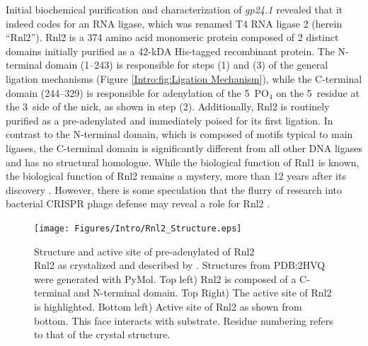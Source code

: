     Initial biochemical purification and characterization of \textit{gp24.1} \citep{Ho2002b} revealed that it indeed codes for an RNA ligase, which was renamed T4 RNA ligase 2 (herein ``Rnl2''). Rnl2 is a 374 amino acid monomeric protein composed of 2 distinct domains initially purified as a 42-kDA His-tagged recombinant protein. The N-terminal domain (1--243) is responsible for steps (1) and (3) of the general ligation mechanisms (Figure \ref{Intro:fig:Ligation Mechanism}), while the C-terminal domain (244--329) is responsible for adenylation of the 5\textprime~PO$_{4}$ on the 5\textprime~residue at the 3\textprime~side of the nick, as shown in step (2). Additionally, Rnl2 is routinely purified as a pre-adenylated and immediately poised for its first ligation. In contrast to the N-terminal domain, which is composed of motifs typical to main ligases, the C-terminal domain is significantly  different from all other DNA ligases and has no structural homologue. While the biological function of Rnl1 is known, the biological function of Rnl2 remains a mystery, more than 12 years after its discovery \citep{Chauleau2013b}. However, there is some speculation that the flurry of research into bacterial CRISPR phage defense may reveal a role for Rnl2 \citep{Barrangou2007c,Chauleau2013b}.

    \begin{figure} %
      \centering 
      \texttt{[image: Figures/Intro/Rnl2\_Structure.eps]}
      \caption[Structure and active site of pre-adenylated of Rnl2]
      {
        Structure and active site of pre-adenylated of Rnl2\\[0.25cm]
        Rnl2 as crystalized and described by \citep{Nandakumar2006}. Structures from PDB:2HVQ were generated with PyMol. Top left) Rnl2 is composed of a C-terminal and N-terminal domain. Top Right) The active site of Rnl2 is highlighted. Bottom left) Active site of Rnl2 as shown from bottom. This face interacts with substrate. Residue numbering refers to that of the crystal structure.
        }
      \label{Intro:fig:Rnl2 General Structure}
      \end{figure}

